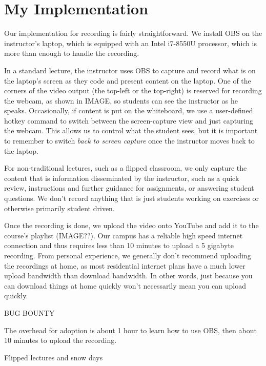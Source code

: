 \documentclass[sigconf]{acmart}
\begin{document}
\section{My Implementation}
\label{implementation}

Our implementation for recording is fairly straightforward.
We install OBS \cite{bailey2017open} on the instructor's laptop, which is equipped with an Intel i7-8550U processor, which is more than enough to handle the recording.

In a standard lecture, the instructor uses OBS to capture and record what is on the laptop's screen as they code and present content on the laptop.
One of the corners of the video output (the top-left or the top-right) is reserved for recording the webcam, as shown in IMAGE, so students can see the instructor as he speaks.
Occasionally, if content is put on the whiteboard, we use a user-defined hotkey command to switch between the screen-capture view and just capturing the webcam.
This allows us to control what the student sees, but it is important to remember to switch \textit{back to screen capture} once the instructor moves back to the laptop.  

For non-traditional lectures, such as a flipped classroom, we only capture the content that is information disseminated by the instructor, such as a quick review, instructions and further guidance for assignments, or answering student questions.
We don't record anything that is just students working on exercises or otherwise primarily student driven.

Once the recording is done, we upload the video onto YouTube and add it to the course's playlist (IMAGE??).
Our campus has a reliable high speed internet connection and thus requires less than 10 minutes to upload a 5 gigabyte recording.
From personal experience, we generally don't recommend uploading the recordings at home, as most residential internet plans have a much lower upload bandwidth than download bandwidth.
In other words, just because you can download things at home quickly won't necessarily mean you can upload quickly.

BUG BOUNTY


The overhead for adoption is about 1 hour to learn how to use OBS, then about 10 minutes to upload the recording.



Flipped lectures and snow days

\end{document}
